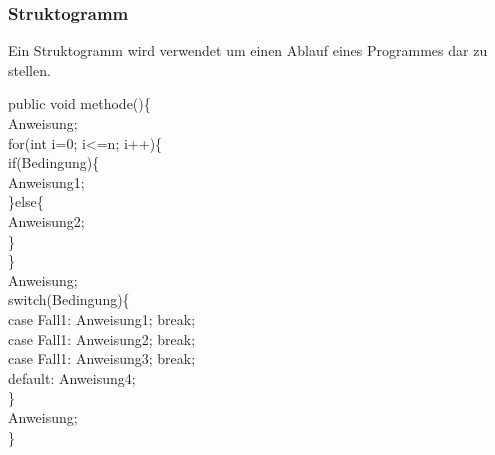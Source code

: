 \documentclass[12pt,a4paper]{article}
\begin{document}
\subsubsection{Struktogramm}
    Ein Struktogramm wird verwendet um einen Ablauf eines Programmes dar zu stellen.
    \begin{center}
    	\begin{minipage}{.4\textwidth}
        \color{gray}
        public void methode()\{\\
        \hspace*{0.5cm}Anweisung;\\
        \hspace*{0.5cm}for(int i=0; i<=n; i++)\{\\
        \hspace*{1cm}if(Bedingung)\{\\
        \hspace*{1.5cm}Anweisung1;\\
        \hspace*{1cm}\}else\{\\
        \hspace*{1.5cm}Anweisung2;\\
        \hspace*{1cm}\}\\
        \hspace*{0.5cm}\}\\
        \hspace*{0.5cm}Anweisung;\\
        \hspace*{0.5cm}switch(Bedingung)\{\\
        \hspace*{1cm}case Fall1: Anweisung1; break;\\
        \hspace*{1cm}case Fall1: Anweisung2; break;\\
        \hspace*{1cm}case Fall1: Anweisung3; break;\\
        \hspace*{1cm}default: Anweisung4;\\
        \hspace*{0.5cm}\}\\
        \hspace*{0.5cm}Anweisung;\\
        \}\\
    \end{minipage}
    \begin{minipage}{.5\textwidth}

\end{minipage}
\end{center}
\end{document}
